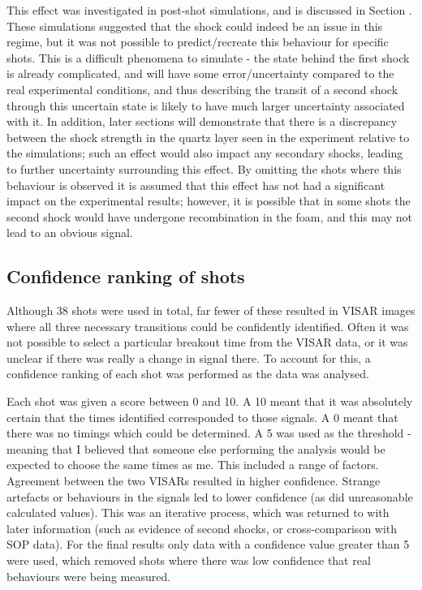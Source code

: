 This effect was investigated in post-shot simulations, and is discussed in Section \label{Shock merger}. These simulations suggested that the shock could indeed be an issue in this regime, but it was not possible to predict/recreate this behaviour for specific shots. This is a difficult phenomena to simulate - the state behind the first shock is already complicated, and will have some error/uncertainty compared to the real experimental conditions, and thus describing the transit of a second shock through this uncertain state is likely to have much larger uncertainty associated with it. In addition, later sections will demonstrate that there is a discrepancy between the shock strength in the quartz layer seen in the experiment relative to the simulations; such an effect would also impact any secondary shocks, leading to further uncertainty surrounding this effect. By omitting the shots where this behaviour is observed it is assumed that this effect has not had a significant impact on the experimental results; however, it is possible that in some shots the second shock would have undergone recombination in the foam, and this may not lead to an obvious signal.

\subsection{Confidence ranking of shots} \label{Confidence}
Although 38 shots were used in total, far fewer of these resulted in VISAR images where all three necessary transitions could be confidently identified. Often it was not possible to select a particular breakout time from the VISAR data, or it was unclear if there was really a change in signal there. To account for this, a confidence ranking of each shot was performed as the data was analysed.

Each shot was given a score between 0 and 10. A 10 meant that it was absolutely certain that the times identified corresponded to those signals. A 0 meant that there was no timings which could be determined. A 5 was used as the threshold - meaning that I believed that someone else performing the analysis would be expected to choose the same times as me. This included a range of factors. Agreement between the two VISARs resulted in higher confidence. Strange artefacts or behaviours in the signals led to lower confidence (as did unreasonable calculated values). This was an iterative process, which was returned to with later information (such as evidence of second shocks, or cross-comparison with SOP data). For the final results only data with a confidence value greater than 5 were used, which removed shots where there was low confidence that real behaviours were being measured.





